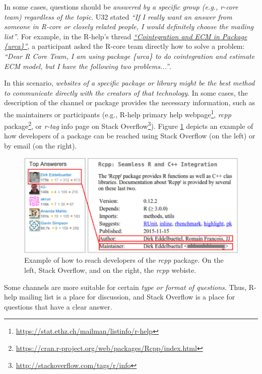     In some cases, questions should be \emph{answered by a \textit{specific group} (e.g., r-core team) regardless of the topic}.
    U32 stated \textit{``If I really want an answer from someone in R-core or closely related people, I would definitely choose the mailing list''}.
    For example, in the R-help's thread \textit{\href{http://goo.gl/7olLv7}{``Cointegration and ECM in Package \{urca\}''}}, a participant asked the R-core team directly how to solve a problem: \textit{``Dear R Core Team, I am using package \{urca\} to do cointegration and estimate ECM model, but I have the following two problems...''}.

    In this scenario, \emph{websites of a specific package or library might be the best method to communicate directly with the creators of that technology}.
    In some cases, the description of the channel or package provides the necessary information, such as the maintainers or participants (e.g., R-help primary help webpage\footnote{\url{https://stat.ethz.ch/mailman/listinfo/r-help}}, \emph{rcpp} package\footnote{\url{https://cran.r-project.org/web/packages/Rcpp/index.html}}, or \textit{r-tag} info page on Stack Overflow\footnote{\url{http://stackoverflow.com/tags/r/info}}).
    Figure \ref{fig:CCchannel} depicts an example of how developers of a package can be reached using Stack Overflow (on the left) or by email (on the right). 

    \begin{figure} [!htb]
        \centering
        \includegraphics[width=.9\columnwidth]{Figures/CCchannel}
        \caption{Example of how to reach developers of the \emph{rcpp} package. On the left, Stack Overflow, and on the right, the \emph{rcpp} webiste.}
        \label{fig:CCchannel}
    \end{figure}

    Some channels are more suitable for certain \emph{type or format of questions}. 
    Thus, R-help mailing list is a place for discussion, and Stack Overflow is a place for questions that have a clear answer.



